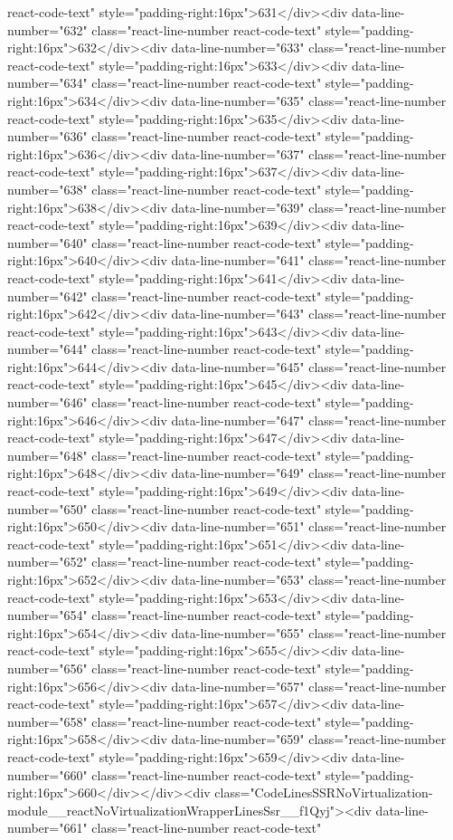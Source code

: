 {{{{{{{react-code-text" style="padding-right:16px">631</div><div data-line-number="632" class="react-line-number react-code-text" style="padding-right:16px">632</div><div data-line-number="633" class="react-line-number react-code-text" style="padding-right:16px">633</div><div data-line-number="634" class="react-line-number react-code-text" style="padding-right:16px">634</div><div data-line-number="635" class="react-line-number react-code-text" style="padding-right:16px">635</div><div data-line-number="636" class="react-line-number react-code-text" style="padding-right:16px">636</div><div data-line-number="637" class="react-line-number react-code-text" style="padding-right:16px">637</div><div data-line-number="638" class="react-line-number react-code-text" style="padding-right:16px">638</div><div data-line-number="639" class="react-line-number react-code-text" style="padding-right:16px">639</div><div data-line-number="640" class="react-line-number react-code-text" style="padding-right:16px">640</div><div data-line-number="641" class="react-line-number react-code-text" style="padding-right:16px">641</div><div data-line-number="642" class="react-line-number react-code-text" style="padding-right:16px">642</div><div data-line-number="643" class="react-line-number react-code-text" style="padding-right:16px">643</div><div data-line-number="644" class="react-line-number react-code-text" style="padding-right:16px">644</div><div data-line-number="645" class="react-line-number react-code-text" style="padding-right:16px">645</div><div data-line-number="646" class="react-line-number react-code-text" style="padding-right:16px">646</div><div data-line-number="647" class="react-line-number react-code-text" style="padding-right:16px">647</div><div data-line-number="648" class="react-line-number react-code-text" style="padding-right:16px">648</div><div data-line-number="649" class="react-line-number react-code-text" style="padding-right:16px">649</div><div data-line-number="650" class="react-line-number react-code-text" style="padding-right:16px">650</div><div data-line-number="651" class="react-line-number react-code-text" style="padding-right:16px">651</div><div data-line-number="652" class="react-line-number react-code-text" style="padding-right:16px">652</div><div data-line-number="653" class="react-line-number react-code-text" style="padding-right:16px">653</div><div data-line-number="654" class="react-line-number react-code-text" style="padding-right:16px">654</div><div data-line-number="655" class="react-line-number react-code-text" style="padding-right:16px">655</div><div data-line-number="656" class="react-line-number react-code-text" style="padding-right:16px">656</div><div data-line-number="657" class="react-line-number react-code-text" style="padding-right:16px">657</div><div data-line-number="658" class="react-line-number react-code-text" style="padding-right:16px">658</div><div data-line-number="659" class="react-line-number react-code-text" style="padding-right:16px">659</div><div data-line-number="660" class="react-line-number react-code-text" style="padding-right:16px">660</div></div><div class="CodeLinesSSRNoVirtualization-module__reactNoVirtualizationWrapperLinesSsr__f1Qyj"><div data-line-number="661" class="react-line-number react-code-text" }}}}}}}
